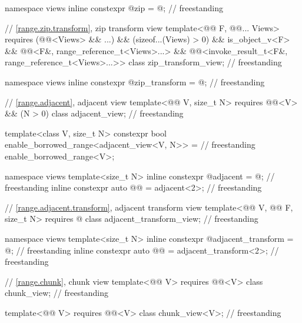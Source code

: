 \begin{codeblock}
{  namespace views { inline constexpr @\unspecnc@ zip = @\unspecnc@; }               // freestanding

  // \ref{range.zip.transform}, zip transform view
  template<@@ F, @@... Views>
    requires (@@<Views> && ...) && (sizeof...(Views) > 0) && is_object_v<F> &&
             @@<F&, range_reference_t<Views>...> &&
             @@<invoke_result_t<F&, range_reference_t<Views>...>>
  class zip_transform_view;                                                         // freestanding

  namespace views { inline constexpr @\unspecnc@ zip_transform = @\unspecnc@; }     // freestanding

  // \ref{range.adjacent}, adjacent view
  template<@@ V, size_t N>
    requires @@<V> && (N > 0)
  class adjacent_view;                                                              // freestanding

  template<class V, size_t N>
    constexpr bool enable_borrowed_range<adjacent_view<V, N>> =                     // freestanding
      enable_borrowed_range<V>;

  namespace views {
    template<size_t N>
      inline constexpr @\unspecnc@ adjacent = @\unspecnc@;                          // freestanding
    inline constexpr auto @@ = adjacent<2>;                                   // freestanding
  }

  // \ref{range.adjacent.transform}, adjacent transform view
  template<@@ V, @@ F, size_t N>
    requires @\seebelow@
  class adjacent_transform_view;                                                    // freestanding

  namespace views {
    template<size_t N>
      inline constexpr @\unspecnc@ adjacent_transform = @\unspecnc@;                // freestanding
    inline constexpr auto @@ = adjacent_transform<2>;               // freestanding
  }

  // \ref{range.chunk}, chunk view
  template<@@ V>
    requires @@<V>
  class chunk_view;                                                                 // freestanding

  template<@@ V>
    requires @@<V>
  class chunk_view<V>;                                                              // freestanding

}
\end{codeblock}
